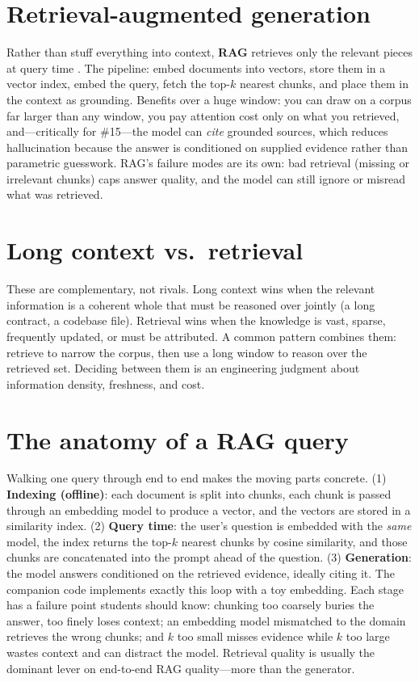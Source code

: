 \documentclass[11pt]{article}
\begin{document}
\section{Retrieval-augmented generation}
Rather than stuff everything into context, \textbf{RAG} retrieves only the relevant pieces at query time
\citep{lewis2020rag}. The pipeline: embed documents into vectors, store them in a vector index, embed the
query, fetch the top-$k$ nearest chunks, and place them in the context as grounding. Benefits over a huge
window: you can draw on a corpus far larger than any window, you pay attention cost only on what you
retrieved, and---critically for \#15---the model can \emph{cite} grounded sources, which reduces
hallucination because the answer is conditioned on supplied evidence rather than parametric guesswork.
RAG's failure modes are its own: bad retrieval (missing or irrelevant chunks) caps answer quality, and the
model can still ignore or misread what was retrieved.

\section{Long context vs.\ retrieval}
These are complementary, not rivals. Long context wins when the relevant information is a coherent whole
that must be reasoned over jointly (a long contract, a codebase file). Retrieval wins when the knowledge is
vast, sparse, frequently updated, or must be attributed. A common pattern combines them: retrieve to narrow
the corpus, then use a long window to reason over the retrieved set. Deciding between them is an engineering
judgment about information density, freshness, and cost.

\section{The anatomy of a RAG query}
Walking one query through end to end makes the moving parts concrete. (1) \textbf{Indexing (offline)}: each
document is split into chunks, each chunk is passed through an embedding model to produce a vector, and the
vectors are stored in a similarity index. (2) \textbf{Query time}: the user's question is embedded with the
\emph{same} model, the index returns the top-$k$ nearest chunks by cosine similarity, and those chunks are
concatenated into the prompt ahead of the question. (3) \textbf{Generation}: the model answers conditioned
on the retrieved evidence, ideally citing it. The companion code implements exactly this loop with a toy
embedding. Each stage has a failure point students should know: chunking too coarsely buries the answer,
too finely loses context; an embedding model mismatched to the domain retrieves the wrong chunks; and $k$
too small misses evidence while $k$ too large wastes context and can distract the model. Retrieval quality
is usually the dominant lever on end-to-end RAG quality---more than the generator.
\end{document}
